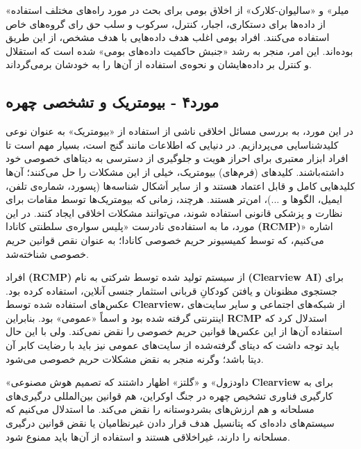 «میلر» و «سالیوان-کلارک» از اخلاق بومی برای بحث در مورد راه‌های مختلف استفاده از داده‌ها برای دستکاری، اجبار، کنترل، سرکوب و سلب حق رای گروه‌های خاص استفاده می‌کنند.
افراد بومی اغلب هدف داده‌هایی با هدف مشخص، از این طریق بوده‌اند.
این امر، منجر به رشد «جنبش حاکمیت داده‌های بومی» شده است که استقلال و کنترل بر داده‌هایشان و نحوه‌ی استفاده از آن‌ها را به خودشان برمی‌گرداند.


\subsection*{مورد۴ - بیومتریک و تشخصی چهره}
\label{subsec:مورد۴ - بیومتریک و تشخصی چهره}
در این مورد، به بررسی مسائل اخلاقی ناشی از استفاده از «بیومتریک» به عنوان نوعی کلیدشناسایی می‌پردازیم.
در دنیایی که اطلاعات مانند گنج است، بسیار مهم است تا افراد ابزار معتبری برای احراز هویت و جلوگیری از دسترسی به دیتاهای خصوصی خود داشته‌باشند.
کلید‌های (فرم‌های) بیومتریک، خیلی از این مشکلات را حل می‌کنند؛ آن‌ها کلیدهایی کامل و قابل اعتماد هستند و از سایر اَشکال شناسه‌ها (پسورد، شماره‌ی تلفن، ایمیل، الگوها و ...)، امن‌تر هستند.
هرچند، زمانی که بیومتریک‌ها توسط مقامات برای نظارت و پزشکی قانونی استفاده شوند، می‌توانند مشکلات اخلاقی ایجاد کنند.
در این مورد، ما به استفاده‌ی نادرست «پلیس سواره‌ی سلطنتی کانادا \textenglish{\textbf{(RCMP)}}» اشاره می‌کنیم، که توسط کمیسیونر حریم خصوصی کانادا؛ به عنوان نقص قوانین حریم خصوصی شناخته‌شد.

افراد \textenglish{\textbf{(RCMP)}} از سیستم تولید شده توسط شرکتی به نام \textenglish{\textbf{(Clearview AI)}} برای جستجوی مظنونان و یافتن کودکانِ قربانی استثمار جنسی آنلاین، استفاده کرده بود.
عکس‌های استفاده شده توسط \textenglish{\textbf{Clearview}}، از شبکه‌های اجتماعی و سایر سایت‌های اینترنتی گرفته شده بود و اسماً «عمومی» بود.
بنابراین \textenglish{\textbf{RCMP}} استدلال کرد که استفاده آن‌ها از این عکس‌ها قوانین حریم خصوصی را نقض نمی‌کند.
ولی با این حال باید توجه داشت که دیتای گرفته‌شده از سایت‌های عمومی نیز باید با رضایت کابر آن دیتا باشد؛ وگرنه منجر به نقض مشکلات حریم خصوصی می‌شود.

«داودزول» و «گلتز» اظهار داشتند که تصمیم هوش مصنوعی \textenglish{\textbf{Clearview}} برای به کارگیری فناوری تشخیص چهره در جنگ اوکراین، هم قوانین بین‌المللی درگیری‌های مسلحانه و هم ارزش‌های بشردوستانه را نقض می‌کند.
ما استدلال می‌کنیم که سیستم‌های داده‌ای که پتانسیل هدف قرار دادن غیرنظامیان یا نقض قوانین درگیری مسلحانه را دارند، غیراخلاقی هستند و استفاده از آن‌ها باید ممنوع شود.

